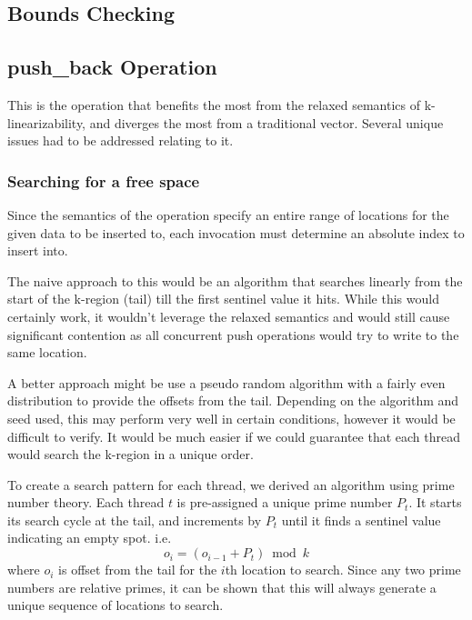 \documentclass{sigplanconf}
\begin{document}
\subsection{Bounds Checking}

\subsection{push\_back Operation}

This is the operation that benefits the most from the relaxed semantics of k-linearizability, and diverges the most from a traditional vector. Several unique issues had to be addressed relating to it.

\subsubsection{Searching for a free space}


Since the semantics of the operation specify an entire range of locations
for the given data to be inserted to, each invocation must determine an absolute index to insert into.

The naive approach to this would be an algorithm that searches linearly
from the start of the k-region (tail) till the first sentinel value
it hits. While this would certainly work, it wouldn't leverage the
relaxed semantics and would still cause significant contention as
all concurrent push operations would try to write to the same location.

A better approach might be use a pseudo random algorithm with a fairly
even distribution to provide the offsets from the tail. Depending
on the algorithm and seed used, this may perform very well in certain
conditions, however it would be difficult to verify. It would be much
easier if we could guarantee that each thread would search the k-region
in a unique order.

To create a search pattern for each thread, we derived an algorithm
using prime number theory. Each thread $t$ is pre-assigned a unique
prime number $P_{t}$. It starts its search cycle at the tail, and
increments by $P_{t}$ until it finds a sentinel value indicating
an empty spot. i.e.
$$o_{i}=(o_{i-1}+P_{t})\bmod{k}$$
where $o_{i}$ is offset from the tail for the $i$th location to
search. Since any two prime numbers are relative primes, it can be
shown that this will always generate a unique sequence of locations
to search.
\end{document}
